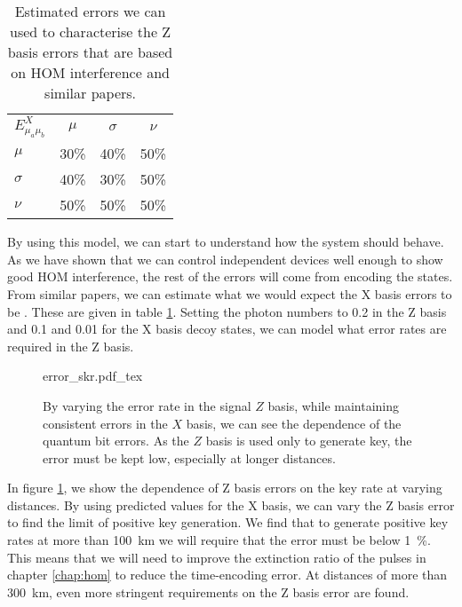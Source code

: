 \begin{table}[tp]
	\centering
	\begin{tabular}{lccc}
		$E^X_{\mu_a\mu_b}$ & $\mu$ & $\sigma$ & $\nu$ \\
		$\mu$             	& 30\%  	& 40\%                      	& 50\%                      \\
		$\sigma$    		& 40\%  	& 30\%                      	& 50\%                      \\
		$\nu$              	& 50\%  	& 50\%                       	& 50\%                   
	\end{tabular}
	\caption[Table of estimated errors for modelling]{Estimated errors we can used to characterise the Z basis errors that are based on \ac{HOM} interference and similar papers.}
	\label{tab:x-errors}
\end{table}

By using this model, we can start to understand how the system should behave. As we have shown that we can control independent devices well enough to show good \ac{HOM} interference, the rest of the errors will come from encoding the states. From similar papers, we can estimate what we would expect the X basis errors to be \cite{Rubenok2013, Comandar2016}. These are given in table \ref{tab:x-errors}. Setting the photon numbers to \num{0.2} in the Z basis and \num{0.1} and \num{0.01} for the X basis decoy states, we can model what error rates are required in the Z basis.

\begin{figure}[tp]
	\centering
	\small
	\def\svgwidth{0.9\textwidth} 
	{error_skr.pdf_tex}
	\caption[Error dependence of secret key rate]{By varying the error rate in the signal $Z$ basis, while maintaining consistent errors in the $X$ basis, we can see the dependence of the quantum bit errors. As the $Z$ basis is used only to generate key, the error must be kept low, especially at longer distances.}
	\label{fig:skr_error_dependence}
\end{figure}

In figure \ref{fig:skr_error_dependence}, we show the dependence of Z basis errors on the key rate at varying distances. By using predicted values for the X basis, we can vary the Z basis error to find the limit of positive key generation. We find that to generate positive key rates at more than \SI{100}{\km} we will require that the error must be below \SI{1}{\percent}. This means that we will need to improve the extinction ratio of the pulses in chapter \ref{chap:hom} to reduce the time-encoding error. At distances of more than \SI{300}{\km}, even more stringent requirements on the Z basis error are found.

